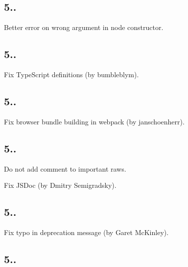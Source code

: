 \subsection*{5..}


\begin{DoxyItemize}
\item Better error on wrong argument in node constructor.
\end{DoxyItemize}

\subsection*{5..}


\begin{DoxyItemize}
\item Fix Type\+Script definitions (by bumbleblym).
\end{DoxyItemize}

\subsection*{5..}


\begin{DoxyItemize}
\item Fix browser bundle building in webpack (by janschoenherr).
\end{DoxyItemize}

\subsection*{5..}


\begin{DoxyItemize}
\item Do not add comment to important raws.
\item Fix J\+S\+Doc (by Dmitry Semigradsky).
\end{DoxyItemize}

\subsection*{5..}


\begin{DoxyItemize}
\item Fix typo in deprecation message (by Garet Mc\+Kinley).
\end{DoxyItemize}

\subsection*{5..}


